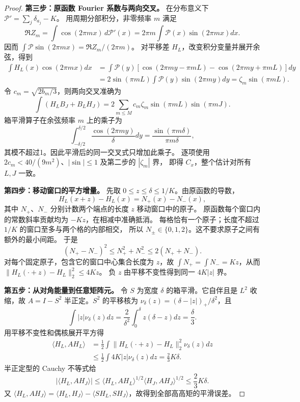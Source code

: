 \begin{proof}
\textbf{第三步：原函数 Fourier 系数与两向交叉。}
在分布意义下 $\mathcal P'=\sum_j\delta_{a_j}-K$。
用周期分部积分，非零频率 $m$ 满足
\[
 \Re Z_m=\int\cos(2\pi mx)\,d\mathcal P'(x)
 =2\pi m\int\mathcal P(x)\sin(2\pi mx)dx.
\]
因而 $\int\mathcal P\sin(2\pi mx)=\Re Z_m/(2\pi m)$。
对平移差 $H_L$，改变积分变量并展开余弦，得到
\begin{align*}
 \int H_L(x)\cos(2\pi mx)dx
 &=\int\mathcal P(y)[\cos(2\pi my-\pi mL)
 -\cos(2\pi my+\pi mL)]dy\\
 &=2\sin(\pi mL)\int\mathcal P(y)\sin(2\pi my)dy
 =\zeta_m\sin(\pi mL).
\end{align*}
令 $c_m=\sqrt{2b_m/3}$，则两向交叉准确为
\[
 \int(H_LB_J+B_LH_J)
 =2\sum_{m\le M}c_m\zeta_m\sin(\pi mL)\sin(\pi mJ).
\]
箱平滑算子在余弦频率 $m$ 上的乘子为
\[
 \int_{-\delta/2}^{\delta/2}\frac{\cos(2\pi my)}\delta dy
 =\frac{\sin(\pi m\delta)}{\pi m\delta},
\]
其模不超过1。因此平滑后的同一交叉式只增加此乘子。
逐项使用 $2c_m<40/(9m^2)$、$|\sin|\le1$ 及第二步的 $|\zeta_m|$ 界，
即得 $C_x$，整个估计对所有 $L,J$ 一致。

\textbf{第四步：移动窗口的平方增量。}
先取 $0\le z\le\delta\le1/K$。由原函数的导数，
\[
 H_L(x+z)-H_L(x)=N_+(x)-N_-(x),
\]
其中 $N_+$、$N_-$ 分别计数两个端点的长度 $z$ 移动窗口中的原子。
原函数每个窗口内的常数斜率贡献均为 $-Kz$，在相减中准确抵消。
每格恰有一个原子；长度不超过 $1/K$ 的窗口至多与两个格的内部相交，
所以 $N_\pm\in\{0,1,2\}$。这不要求原子之间有额外的最小间距。
于是
\[
 (N_+-N_-)^2\le N_+^2+N_-^2\le2(N_++N_-).
\]
对每个固定原子，包含它的窗口中心集合长度为 $z$，故
$\int N_+=\int N_-=Kz$，从而
$\|H_L(\cdot+z)-H_L\|_2^2\le4Kz$。
负 $z$ 由平移不变性得到同一 $4K|z|$ 界。

\textbf{第五步：从对角能量到任意矩阵元。}
令 $S$ 为宽度 $\delta$ 的箱平滑。它自伴且是 $L^2$ 收缩，故
$A=I-S^2$ 半正定。$S^2$ 的平移核为
$\nu_\delta(z)=(\delta-|z|)_+/\delta^2$，且
\[
 \int|z|\nu_\delta(z)dz
 =\frac2{\delta^2}\int_0^\delta z(\delta-z)dz=\frac\delta3.
\]
用平移不变性和偶核展开平方得
\begin{align*}
 \langle H_L,AH_L\rangle
 &=\frac12\int\|H_L(\cdot+z)-H_L\|_2^2\nu_\delta(z)dz\\
 &\le\frac12\int4K|z|\nu_\delta(z)dz=\frac23K\delta.
\end{align*}
半正定型的 Cauchy 不等式给
\[
 |\langle H_L,AH_J\rangle|
 \le\langle H_L,AH_L\rangle^{1/2}
 \langle H_J,AH_J\rangle^{1/2}\le\frac23K\delta.
\]
又 $\langle H_L,AH_J\rangle=\langle H_L,H_J\rangle-
\langle SH_L,SH_J\rangle$，故得到全部高高矩的平滑误差。
\end{proof}

